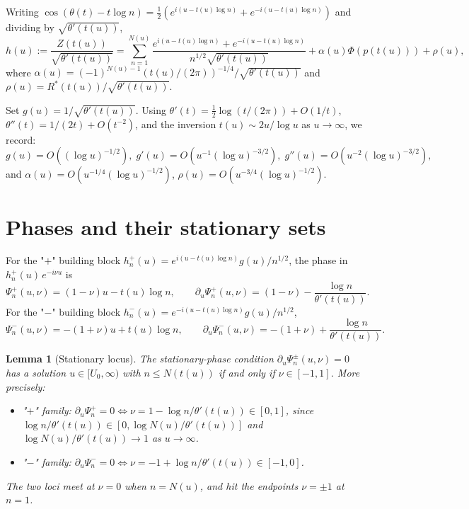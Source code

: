 \documentclass[11pt]{article}
\newtheorem{lemma}[theorem]{Lemma}
\theoremstyle{definition}
\theoremstyle{remark}
\begin{document}
Writing $\cos(\theta(t)-t\log n)
=\tfrac12(e^{i(u-t(u)\log n)}+e^{-i(u-t(u)\log n)})$ and dividing by
$\sqrt{\theta'(t(u))}$,
\begin{equation}\label{eq:h}
  h(u):=\frac{Z(t(u))}{\sqrt{\theta'(t(u))}}
  =\sum_{n=1}^{N(u)}\frac{e^{i(u-t(u)\log n)}+e^{-i(u-t(u)\log n)}}
                         {n^{1/2}\sqrt{\theta'(t(u))}}
  +\alpha(u)\Phi(p(t(u)))+\rho(u),
\end{equation}
where $\alpha(u)=(-1)^{N(u)-1}(t(u)/(2\pi))^{-1/4}/\sqrt{\theta'(t(u))}$
and $\rho(u)=R^*(t(u))/\sqrt{\theta'(t(u))}$.

Set $g(u)=1/\sqrt{\theta'(t(u))}$.  Using
$\theta'(t)=\tfrac12\log(t/(2\pi))+O(1/t)$, $\theta''(t)=1/(2t)+O(t^{-2})$,
and the inversion $t(u)\sim 2u/\log u$ as $u\to\infty$, we record:
\begin{equation}\label{eq:g}
  g(u)=O\!\left((\log u)^{-1/2}\right),\;
  g'(u)=O\!\left(u^{-1}(\log u)^{-3/2}\right),\;
  g''(u)=O\!\left(u^{-2}(\log u)^{-3/2}\right),
\end{equation}
and $\alpha(u)=O(u^{-1/4}(\log u)^{-1/2})$,
$\rho(u)=O(u^{-3/4}(\log u)^{-1/2})$.

\section{Phases and their stationary sets}

For the "$+$" building block $h_n^+(u)=e^{i(u-t(u)\log n)}g(u)/n^{1/2}$, the phase in
$h_n^+(u)\,e^{-i\nu u}$ is
\[
  \Psi_n^+(u,\nu)=(1-\nu)u-t(u)\log n,\qquad
  \partial_u\Psi_n^+(u,\nu)=(1-\nu)-\frac{\log n}{\theta'(t(u))}.
\]
For the "$-$" building block $h_n^-(u)=e^{-i(u-t(u)\log n)}g(u)/n^{1/2}$,
\[
  \Psi_n^-(u,\nu)=-(1+\nu)u+t(u)\log n,\qquad
  \partial_u\Psi_n^-(u,\nu)=-(1+\nu)+\frac{\log n}{\theta'(t(u))}.
\]

\begin{lemma}[Stationary locus]\label{lem:locus}
The stationary-phase condition $\partial_u\Psi_n^\pm(u,\nu)=0$ has a
solution $u\in[U_0,\infty)$ with $n\le N(t(u))$ if and only if
$\nu\in[-1,1]$.  More precisely:
\begin{itemize}
\item "$+$" family: $\partial_u\Psi_n^+=0\iff
  \nu=1-\log n/\theta'(t(u))\in[0,1]$, since
  $\log n/\theta'(t(u))\in[0,\log N(u)/\theta'(t(u))]$ and
  $\log N(u)/\theta'(t(u))\to 1$ as $u\to\infty$.
\item "$-$" family: $\partial_u\Psi_n^-=0\iff
  \nu=-1+\log n/\theta'(t(u))\in[-1,0]$.
\end{itemize}
The two loci meet at $\nu=0$ when $n=N(u)$, and hit the endpoints
$\nu=\pm1$ at $n=1$.
\end{lemma}
\end{document}
